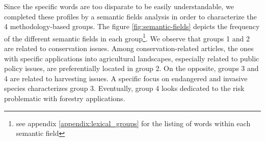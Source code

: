 Since the specific words are too disparate to be easily understandable, we completed these profiles by a semantic fields analysis in order to characterize the 4 methodology-based groups. The figure \ref{fig:semantic-fields} depicts the frequency of the different semantic fields in each group\footnote{see appendix \ref{appendix:lexical_groups} for the listing of words within each semantic field}. We observe that groups 1 and 2 are related to conservation issues. Among conservation-related articles, the ones with specific applications into agricultural landscapes, especially related to public policy issues, are preferentially located in  group 2. On the opposite, groups 3 and 4 are related to harvesting issues. A specific focus on endangered and invasive species characterizes  group 3. Eventually, group 4 looks dedicated to the risk problematic with forestry applications. 

